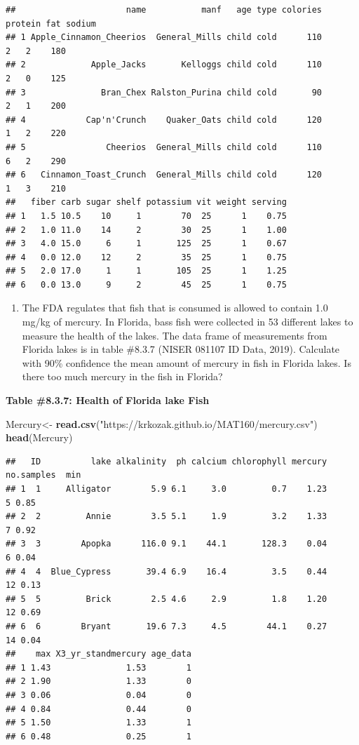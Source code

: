 \documentclass[
]{book}
\newenvironment{Shaded}{\begin{snugshade}}{\end{snugshade}}
\newcommand{\KeywordTok}[1]{\textcolor[rgb]{0.13,0.29,0.53}{\textbf{#1}}}
\newcommand{\NormalTok}[1]{#1}
\newcommand{\StringTok}[1]{\textcolor[rgb]{0.31,0.60,0.02}{#1}}
\providecommand{\tightlist}{%
  \setlength{\itemsep}{0pt}\setlength{\parskip}{0pt}}
\begin{document}
\begin{verbatim}
##                      name           manf   age type colories protein fat sodium
## 1 Apple_Cinnamon_Cheerios  General_Mills child cold      110       2   2    180
## 2             Apple_Jacks       Kelloggs child cold      110       2   0    125
## 3               Bran_Chex Ralston_Purina child cold       90       2   1    200
## 4            Cap'n'Crunch    Quaker_Oats child cold      120       1   2    220
## 5                Cheerios  General_Mills child cold      110       6   2    290
## 6   Cinnamon_Toast_Crunch  General_Mills child cold      120       1   3    210
##   fiber carb sugar shelf potassium vit weight serving
## 1   1.5 10.5    10     1        70  25      1    0.75
## 2   1.0 11.0    14     2        30  25      1    1.00
## 3   4.0 15.0     6     1       125  25      1    0.67
## 4   0.0 12.0    12     2        35  25      1    0.75
## 5   2.0 17.0     1     1       105  25      1    1.25
## 6   0.0 13.0     9     2        45  25      1    0.75
\end{verbatim}

\begin{enumerate}
\def\labelenumi{\arabic{enumi}.}
\setcounter{enumi}{2}
\tightlist
\item
  The FDA regulates that fish that is consumed is allowed to contain 1.0 mg/kg of mercury. In Florida, bass fish were collected in 53 different lakes to measure the health of the lakes. The data frame of measurements from Florida lakes is in table \#8.3.7 (NISER 081107 ID Data, 2019). Calculate with 90\% confidence the mean amount of mercury in fish in Florida lakes. Is there too much mercury in the fish in Florida?
\end{enumerate}

\textbf{Table \#8.3.7: Health of Florida lake Fish}

\begin{Shaded}
\begin{Highlighting}[]
\NormalTok{Mercury<-}\StringTok{ }\KeywordTok{read.csv}\NormalTok{(}\StringTok{"https://krkozak.github.io/MAT160/mercury.csv"}\NormalTok{)}
\KeywordTok{head}\NormalTok{(Mercury)}
\end{Highlighting}
\end{Shaded}

\begin{verbatim}
##   ID          lake alkalinity  ph calcium chlorophyll mercury no.samples  min
## 1  1     Alligator        5.9 6.1     3.0         0.7    1.23          5 0.85
## 2  2         Annie        3.5 5.1     1.9         3.2    1.33          7 0.92
## 3  3        Apopka      116.0 9.1    44.1       128.3    0.04          6 0.04
## 4  4  Blue_Cypress       39.4 6.9    16.4         3.5    0.44         12 0.13
## 5  5         Brick        2.5 4.6     2.9         1.8    1.20         12 0.69
## 6  6        Bryant       19.6 7.3     4.5        44.1    0.27         14 0.04
##    max X3_yr_standmercury age_data
## 1 1.43               1.53        1
## 2 1.90               1.33        0
## 3 0.06               0.04        0
## 4 0.84               0.44        0
## 5 1.50               1.33        1
## 6 0.48               0.25        1
\end{verbatim}
\end{document}
